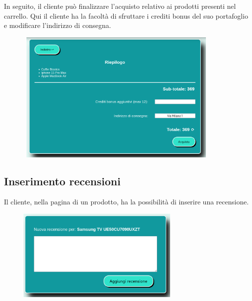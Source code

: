 \documentclass[a4paper, 14pt]{article}
\begin{document}
\begin{flushleft}
				In seguito, il cliente può finalizzare l'acquisto relativo ai prodotti presenti nel carrello.
				Qui il cliente ha la facoltà di sfruttare i crediti bonus del suo portafoglio e modificare l'indirizzo di consegna.
				\begin{figure}[H]
					\centering
					\includegraphics[width=10cm, height=6.5cm, frame=2pt]{"screenFinalizzaAcquisto.png"}	
				\end{figure}
			
			\subsection{Inserimento recensioni}
				Il cliente, nella pagina di un prodotto, ha la possibilità di inserire una recensione.
				\begin{figure}[H]
					\centering
					\includegraphics[height=4.5cm, frame=2pt]{"screenRecensioni.png"}	
				\end{figure}

\end{flushleft}
\end{document}
